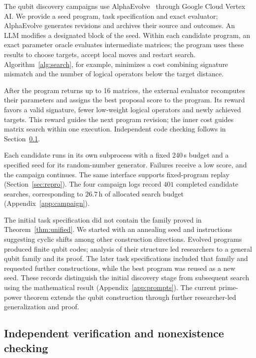 \documentclass{article}
\begin{document}
The qubit discovery campaigns use AlphaEvolve~\citep{AlphaEvolve} through
Google Cloud Vertex AI. We provide a seed program, task specification
and exact evaluator; AlphaEvolve generates revisions and archives their
source and outcomes. An LLM modifies a designated block of the seed.
Within each candidate program, an exact parameter oracle evaluates
intermediate matrices; the program uses these results to choose targets,
accept local moves and restart search. Algorithm~\ref{alg:search}, for
example, minimizes a cost combining signature mismatch and the number
of logical operators below the target distance.

After the program returns up to 16 matrices, the external evaluator
recomputes their parameters and assigns the best proposal score to the
program. Its reward favors a valid signature, fewer low-weight logical
operators and newly achieved targets. This reward guides the next program
revision; the inner cost guides matrix search within one execution.
Independent code checking follows in Section~\ref{sec:refute}.

Each candidate runs in its own subprocess with a fixed 240\,s budget
and a specified seed for its random-number generator. Failures receive a low score, and the campaign continues.
The same interface supports fixed-program replay (Section~\ref{sec:repro}).
The four campaign logs record $401$ completed candidate searches,
corresponding to $26.7$\,h of allocated search budget
(Appendix~\ref{app:campaign}).

The initial task specification did not contain the family proved in
Theorem~\ref{thm:unified}. We started with an annealing seed and instructions suggesting cyclic
shifts among other construction directions. Evolved programs produced finite qubit codes; analysis of
their structure led researchers to a general qubit family and its proof.
The later task specifications included that family and requested further
constructions, while the best program was reused as a new seed.
These records distinguish the initial discovery stage from subsequent
search using the mathematical result (Appendix~\ref{app:prompts}).
The current prime-power theorem extends the qubit construction through
further researcher-led generalization and proof.

\subsection{Independent verification and nonexistence checking}\label{sec:refute}
\end{document}
